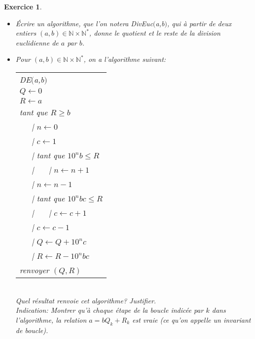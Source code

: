 \documentclass[11pt,a4paper]{article}
\newtheorem{ex}{Exercice}
\begin{document}
\begin{ex}\label{exDivision_Euclidienne}\
\begin{itemize}
\item[$1.$] Écrire un algorithme, que l'on notera DivEuc$($a,b$)$, qui à partir de deux entiers $(a,b) \in \mathbb{N}\times \mathbb{N}^* $, donne le quotient et le reste de la division euclidienne de $a$ par $b$.
\item[$2.$]
Pour $(a,b) \in \mathbb{N}\times \mathbb{N}^*$, on a l'algorithme suivant:

\begin{center}
\begin{tabular}{l}
DE$($a,b$)$\\
$ Q \leftarrow 0$ \\
$R \leftarrow a$ \\
tant que $R\geq b$ \\
\ \ \ {\rm |} $n \leftarrow 0$ \\
\ \ \ {\rm |}   $c \leftarrow 1$ \\
\ \ \ {\rm |}   tant que $10^n b \leq R$ \\ 
\ \ \ {\rm |} \ \ \ {\rm |} $n \leftarrow n+1$\\
\ \ \ {\rm |}     $n \leftarrow n-1$ \\
\ \ \ {\rm |}    tant que $10^{n}bc \leq R$ \\ 
 \ \ \ {\rm |} \ \ \ {\rm |}    $c \leftarrow c+1$\\
 \ \ \ {\rm |}  $c \leftarrow c-1$ \\
\ \ \ {\rm |}     $Q \leftarrow Q+10^{n}c$\\
\ \ \ {\rm |}   $R \leftarrow R-10^{n}bc$\\
renvoyer $(Q,R)$      \\

\end{tabular}
\end{center}
\ \\
Quel résultat renvoie cet algorithme? Justifier. \\
\textit{Indication: Montrer qu'à chaque étape de la boucle indicée par $k$ dans l'algorithme, la relation $a=bQ_k+R_k$ est vraie (ce qu'on appelle un invariant de boucle).}

\end{itemize}  
  
  
\end{ex}
\end{document}
